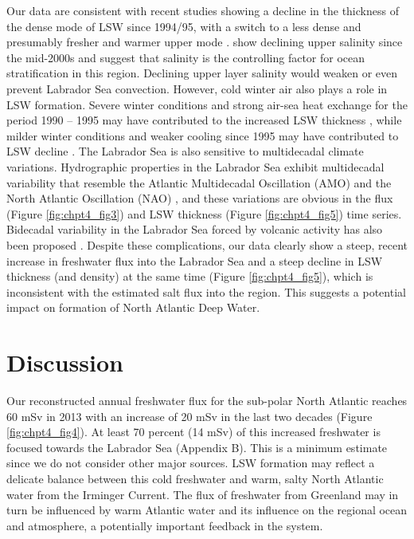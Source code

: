 Our data are consistent with recent studies showing a decline in the thickness of the dense mode of LSW since 1994/95, with a switch to a less dense and presumably fresher and warmer upper mode \cite{rhein2011,kieke2015}. \citet{yashayaev2015} show declining upper salinity since the mid-2000s and suggest that salinity is the controlling factor for ocean stratification in this region.  Declining upper layer salinity would weaken or even prevent Labrador Sea convection.  However, cold winter air also plays a role in LSW formation.  Severe winter conditions and strong air-sea heat exchange for the period 1990 – 1995 may have contributed to the increased LSW thickness \cite[]{lazier2002}, while milder winter conditions and weaker cooling since 1995 may have contributed to LSW decline \cite{vage2009}.  The Labrador Sea is also sensitive to multidecadal climate variations.  Hydrographic properties in the Labrador Sea exhibit multidecadal variability that resemble the Atlantic Multidecadal Oscillation (AMO) and the North Atlantic Oscillation (NAO) \cite[]{yashayaev2015}, and these variations are obvious in the flux (Figure \ref{fig:chpt4_fig3}) and LSW thickness (Figure \ref{fig:chpt4_fig5}) time series.  Bidecadal variability in the Labrador Sea forced by volcanic activity has also been proposed \cite[]{swingedouw2015}.  Despite these complications, our data clearly show a steep, recent increase in freshwater flux into the Labrador Sea and a steep decline in LSW thickness (and density) at the same time (Figure \ref{fig:chpt4_fig5}), which is inconsistent with the estimated salt flux into the region.  This suggests a potential impact on formation of North Atlantic Deep Water.  

\section{Discussion}
Our reconstructed annual freshwater flux for the sub-polar North Atlantic reaches 60 mSv in 2013 with an increase of 20 mSv in the last two decades (Figure \ref{fig:chpt4_fig4}).  At least 70 percent (14 mSv) of this increased freshwater is focused towards the Labrador Sea (Appendix B).  This is a minimum estimate since we do not consider other major sources.  LSW formation may reflect a delicate balance between this cold freshwater and warm, salty North Atlantic water from the Irminger Current.  The flux of freshwater from Greenland may in turn be influenced by warm Atlantic water and its influence on the regional ocean and atmosphere, a potentially important feedback in the system.  

